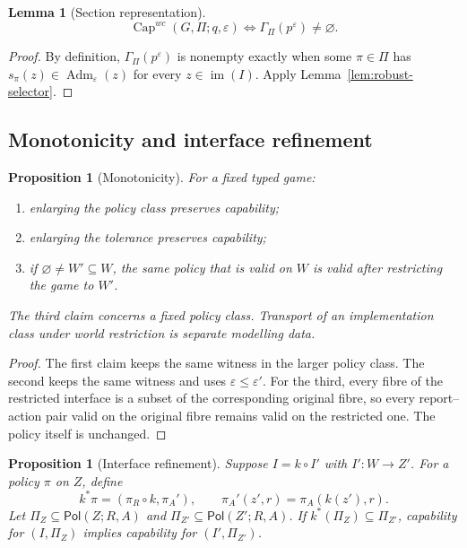 \documentclass[11pt]{article}
\theoremstyle{plain}
\newtheorem{proposition}[theorem]{Proposition}
\newtheorem{lemma}[theorem]{Lemma}
\theoremstyle{definition}
\theoremstyle{remark}
\newcommand{\im}{\operatorname{im}}
\newcommand{\Capability}{\operatorname{Cap}}
\newcommand{\Adm}{\operatorname{Adm}}
\newcommand{\Pol}{\mathsf{Pol}}
\newcommand{\eps}{\varepsilon}
\begin{document}
\begin{lemma}[Section representation]\label{lem:section-representation}
\[
\Capability^{wc}(G,\Pi;q,\eps)
\iff
\Gamma_\Pi(p^\eps)\ne\varnothing.
\]
\end{lemma}

\begin{proof}
By definition, $\Gamma_\Pi(p^\eps)$ is nonempty exactly when some
$\pi\in\Pi$ has $s_\pi(z)\in\Adm_\eps(z)$ for every $z\in\im(I)$. Apply
Lemma~\ref{lem:robust-selector}.
\end{proof}

\subsection{Monotonicity and interface refinement}

\begin{proposition}[Monotonicity]\label{prop:monotone}
For a fixed typed game:
\begin{enumerate}[label=(\roman*)]
\item enlarging the policy class preserves capability;
\item enlarging the tolerance preserves capability;
\item if $\varnothing\ne W'\subseteq W$, the same policy that is valid on $W$
is valid after restricting the game to $W'$.
\end{enumerate}
The third claim concerns a fixed policy class. Transport of an implementation
class under world restriction is separate modelling data.
\end{proposition}

\begin{proof}
The first claim keeps the same witness in the larger policy class. The second
keeps the same witness and uses $\eps\le\eps'$. For the third, every fibre of the
restricted interface is a subset of the corresponding original fibre, so every
report--action pair valid on the original fibre remains valid on the restricted
one. The policy itself is unchanged.
\end{proof}

\begin{proposition}[Interface refinement]\label{prop:refine}
Suppose $I=k\circ I'$ with $I':W\to Z'$. For a policy $\pi$ on $Z$, define
\[
k^*\pi=(\pi_R\circ k,\pi_A'),\qquad
\pi_A'(z',r)=\pi_A(k(z'),r).
\]
Let $\Pi_Z\subseteq\Pol(Z;R,A)$ and
$\Pi_{Z'}\subseteq\Pol(Z';R,A)$. If
$k^*(\Pi_Z)\subseteq\Pi_{Z'}$, capability for $(I,\Pi_Z)$ implies capability
for $(I',\Pi_{Z'})$.
\end{proposition}
\end{document}
